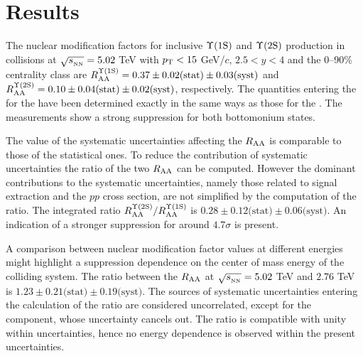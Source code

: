 
\section{Results}\label{section:results}

The nuclear modification factors for  inclusive $\mbox{$\Upsilon$(1S)}$ and $\mbox{$\Upsilon$(2S)}$ production in \pbpb collisions at $\sqrt{s_{_{\rm NN}}}=5.02$ \rm{TeV} with $p_{\rm T} < 15$ GeV/$c$, $2.5 < y < 4$ and the 0--90\% centrality class are $R_{\rm{AA}}^{\Upsilon(\rm1S)}=0.37\pm0.02\text{(stat)}\pm0.03\text{(syst)}$  and $R_{\rm{AA}}^{\Upsilon(\rm2S)}=0.10\pm{0.04}\text{(stat)}\pm{0.02}\text{(syst)}$, respectively.
The quantities entering the \raa for the \upsiss have been determined exactly in the same ways as those for the \upsis.
The measurements show a strong suppression for both bottomonium states.

The value of the systematic uncertainties affecting the $R_{\rm{AA}}$ is comparable to those of the statistical ones.
To reduce the contribution of systematic uncertainties the ratio of the two $R_{\rm{AA}}$ can be computed.
However the dominant contributions to the systematic uncertainties, namely those related to signal extraction and the $pp$ cross section, are not simplified by the computation of the ratio.
The integrated ratio $R_{\rm{AA}}^{\Upsilon(\rm2S)}/R_{\rm{AA}}^{\Upsilon(\rm1S)}$ is $0.28\pm0.12\text{(stat)}\pm0.06\text{(syst)}$. 
An indication of a stronger suppression for \upsiss around $4.7\sigma$ is present.

A comparison between \upsis nuclear modification factor values at different energies might highlight a suppression dependence on the center of mass energy of the colliding system.
The ratio between the \upsis $\mbox{$R_{\rm{AA}}$}$ at $\sqrt{s_{_{\rm NN}}}=5.02$ \rm{TeV} and $2.76$ \rm{TeV} is $1.23\pm0.21\text{(stat)}\pm0.19\text{(syst)}$. 
The sources of systematic uncertainties entering the calculation of the ratio are considered uncorrelated, except for the \taa component, whose uncertainty cancels out. 
The ratio is compatible with unity within uncertainties, hence no energy dependence is observed within the present uncertainties.

